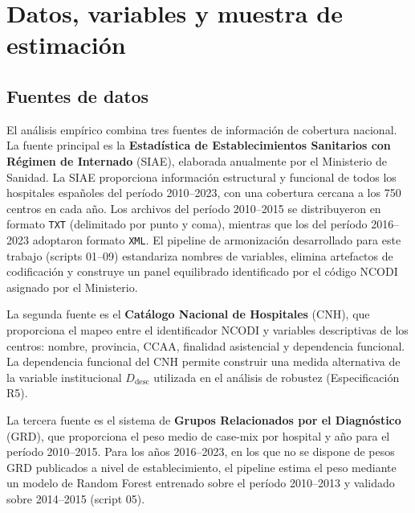 
\section{Datos, variables y muestra de estimación}
\label{sec:datos_muestra}

\subsection{Fuentes de datos}
\label{subsec:fuentes}

El análisis empírico combina tres fuentes de información de cobertura nacional.
La fuente principal es la \textbf{Estadística de Establecimientos Sanitarios con Régimen de Internado} (SIAE), elaborada anualmente por el Ministerio de Sanidad. La SIAE proporciona información estructural y funcional de todos los hospitales españoles del período 2010–2023, con una cobertura cercana a los 750 centros en cada año. Los archivos del período 2010–2015 se distribuyeron en formato \texttt{TXT} (delimitado por punto y coma), mientras que los del período 2016–2023 adoptaron formato \texttt{XML}. El pipeline de armonización desarrollado para este trabajo (scripts 01–09) estandariza nombres de variables, elimina artefactos de codificación y construye un panel equilibrado identificado por el código NCODI asignado por el Ministerio.

La segunda fuente es el \textbf{Catálogo Nacional de Hospitales} (CNH), que proporciona el mapeo entre el identificador NCODI y variables descriptivas de los centros: nombre, provincia, CCAA, finalidad asistencial y dependencia funcional. La dependencia funcional del CNH permite construir una medida alternativa de la variable institucional \(D_{\text{desc}}\) utilizada en el análisis de robustez (Especificación R5).

La tercera fuente es el sistema de \textbf{Grupos Relacionados por el Diagnóstico} (GRD), que proporciona el peso medio de case-mix por hospital y año para el período 2010–2015. Para los años 2016–2023, en los que no se dispone de pesos GRD publicados a nivel de establecimiento, el pipeline estima el peso mediante un modelo de Random Forest entrenado sobre el período 2010–2013 y validado sobre 2014–2015 (script 05).

